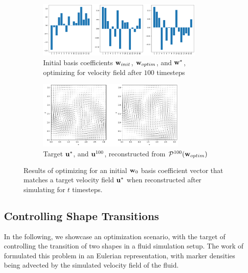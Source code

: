 \begin{figure}
  \begin{subfigure}{\textwidth}
    \centering
    \includegraphics[width=0.9\textwidth]{figures/finding-initial-velocities/t_100_coefficients.png}
    \caption{Initial basis coefficients $\vb{w}_{init}$, $\vb{w}_{optim}$, and
    $\vb{w}^*$, optimizing for velocity field after $100$ timesteps\\}
    \label{fig:100-timesteps-coeffs}
  \end{subfigure}\par\medskip
  \begin{subfigure}{\textwidth}
    \centering
    \includegraphics[width=0.8\textwidth]{figures/finding-initial-velocities/t_100_velocities.png}
    \caption{Target $\vb{u}^*$, and $\vb{u}^{100}$, reconstructed from
      $\mathcal{P}^{100}(\vb{w}_{optim})$}
    \label{fig:100-timesteps-vel}
  \end{subfigure}
  \caption{Results of optimizing for an initial $\vb{w}_0$ basis coefficient
    vector that matches a target velocity field $\vb{u}^*$ when reconstructed
    after simulating for $t$ timesteps.
  }
  \label{fig:matching-velocities}
\end{figure}

\subsection{Controlling Shape Transitions}
\label{section:controlling-shape-transitions}
In the following, we showcase an optimization scenario, with the target of
controlling the transition of two shapes in a fluid simulation setup.  The work
of \cite{holl2019pdecontrol} formulated this problem in an Eulerian
representation, with marker densities being advected by the simulated velocity
field of the fluid. 

